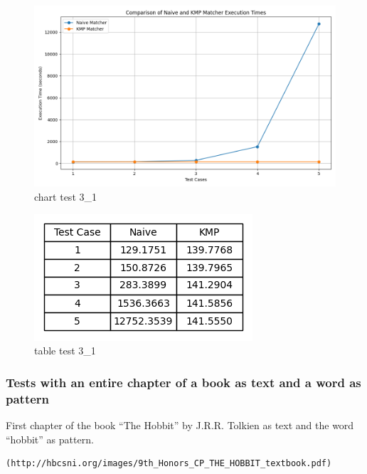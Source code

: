 \documentclass[11pt]{article}
\begin{document}
                \begin{figure}[H]
                    \centering
                    \includegraphics[width = \textwidth]{execution_times_3_1}
                    \caption{chart test 3\_1}
                    \label{fig:chart_test_3_1}
                \end{figure}

                \begin{figure}[H]
                    \centering
                    \includegraphics[width = 0.5 \textwidth]{table_execution_times_3_1}
                    \caption{table test 3\_1}
                    \label{fig:table_test_3_1}
                \end{figure}

            \newpage

            \subsubsection{Tests with an entire chapter of a book as text and a word as pattern} \label{subsubsec:tests_4}


                First chapter of the book ``The Hobbit'' by J.R.R. Tolkien as text and the word ``hobbit'' as pattern.
                \begin{verbatim}(http://hbcsni.org/images/9th_Honors_CP_THE_HOBBIT_textbook.pdf)\end{verbatim}
\end{document}
